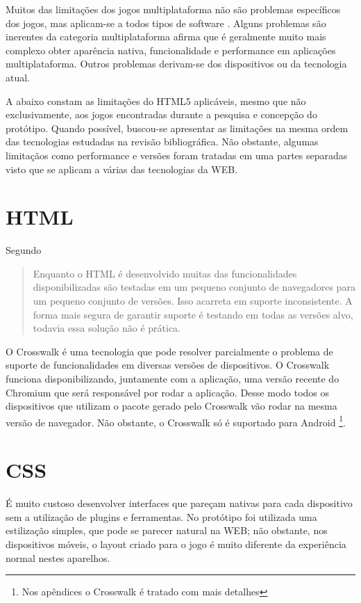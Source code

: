 
Muitos das limitações dos jogos multiplataforma não são
problemas específicos dos jogos, mas aplicam-se a todos tipos
de software \autocite[p. 3]{currentStateCrossPlatform}. Alguns
problemas são inerentes da categoria multiplataforma \cite[pp.
7 ]{viabilityBusinessApplications} afirma que é geralmente muito
mais complexo obter aparência nativa, funcionalidade e performance
em aplicações multiplataforma. Outros problemas derivam-se dos
dispositivos ou da tecnologia atual.

A abaixo constam as limitações do HTML5 aplicáveis, mesmo que não
exclusivamente, aos jogos encontradas durante a pesquisa e concepção
do protótipo. Quando possível, buscou-se apresentar as limitações
na mesma ordem das tecnologias estudadas na revisão bibliográfica.
Não obstante, algumas limitaçãos como performance e versões foram
tratadas em uma partes separadas visto que se aplicam a várias das
tecnologias da WEB.

\section{HTML}

Segundo \citet{crossPlatformMobileGame}
\begin{quote}
Enquanto o HTML é desenvolvido muitas das funcionalidades
disponibilizadas são testadas em um pequeno conjunto de navegadores
para um pequeno conjunto de versões. Isso acarreta em suporte
inconsistente. A forma mais segura de garantir suporte é testando em
todas as versões alvo, todavia essa solução não é prática.
\end{quote}

O Crosswalk é uma tecnologia que pode resolver parcialmente o problema
de suporte de funcionalidades em diversas versões de dispositivos.
O Crosswalk funciona disponibilizando, juntamente com a aplicação,
uma versão recente do Chromium que será responsável por rodar a
aplicação. Desse modo todos os dispositivos que utilizam o pacote
gerado pelo Crosswalk vão rodar na mesma versão de navegador. Não
obstante, o Crosswalk só é suportado para Android \footnote{Nos
apêndices o Crosswalk é tratado com mais detalhes}.

\section{CSS}

É muito custoso desenvolver interfaces que pareçam nativas para
cada dispositivo sem a utilização de plugins e ferramentas. No
protótipo foi utilizada uma estilização simples, que pode se parecer
natural na WEB; não obstante, nos dispositivos móveis, o layout criado
para o jogo é muito diferente da experiência normal nestes aparelhos.

